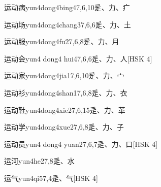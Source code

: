 \begin{entry}{运动病}{yun4dong4bing4}{7,6,10}{⾡、⼒、⽧}
\end{entry}

\begin{entry}{运动场}{yun4dong4chang3}{7,6,6}{⾡、⼒、⼟}
\end{entry}

\begin{entry}{运动服}{yun4dong4fu2}{7,6,8}{⾡、⼒、⽉}
\end{entry}

\begin{entry}{运动会}{yun4 dong4 hui4}{7,6,6}{⾡、⼒、⼈}[HSK 4]
\end{entry}

\begin{entry}{运动家}{yun4dong4jia1}{7,6,10}{⾡、⼒、⼧}
\end{entry}

\begin{entry}{运动衫}{yun4dong4shan1}{7,6,8}{⾡、⼒、⾐}
\end{entry}

\begin{entry}{运动鞋}{yun4dong4xie2}{7,6,15}{⾡、⼒、⾰}
\end{entry}

\begin{entry}{运动学}{yun4dong4xue2}{7,6,8}{⾡、⼒、⼦}
\end{entry}

\begin{entry}{运动员}{yun4 dong4 yuan2}{7,6,7}{⾡、⼒、⼝}[HSK 4]
\end{entry}

\begin{entry}{运河}{yun4he2}{7,8}{⾡、⽔}
\end{entry}

\begin{entry}{运气}{yun4qi5}{7,4}{⾡、⽓}[HSK 4]
\end{entry}

